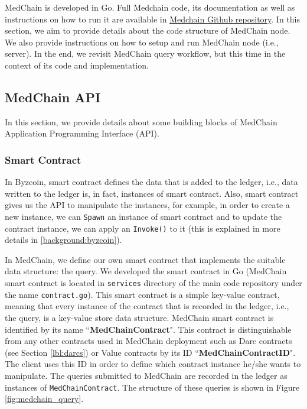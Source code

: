 MedChain is developed in Go. Full Medchain code, its documentation as well as instructions on how to run it are available in \href{https://github.com/ldsec/medchain/tree/dev}{Medchain Github repository}. In this section, we aim to provide details about the code structure of MedChain node. We also provide instructions on how to setup and run MedChain node (i.e., server). In the end, we revisit MedChain query workflow, but this time in the context of its code and implementation.  

\subsection{MedChain API}
In this section, we provide details about some building blocks of MedChain Application Programming Interface (API). 

\subsubsection{Smart Contract}
In Byzcoin, smart contract defines the data that is added to the ledger, i.e., data written to the ledger is, in fact, instances of smart contract. Also, smart contract gives us the API to manipulate the instances, for example, in order to create a new instance, we can \texttt{Spawn} an instance of smart contract and to update the contract instance, we can apply an \texttt{Invoke()} to it (this is explained in more details in \ref{background:byzcoin}). 

In MedChain, we define our own smart contract that implements the suitable data structure: the query. We developed the smart contract in Go (MedChain smart contract is located in \texttt{services} directory of the main code repository under the name \texttt{contract.go}). This smart contract is a simple key-value contract, meaning that every instance of the contract that is recorded in the ledger, i.e., the query, is a key-value store data structure. MedChain smart contract is identified by its name ``\textbf{MedChainContract}". This contract is distinguishable from any other contracts used in MedChain deployment such as Darc contracts (see Section \ref{lbl:darcs}) or Value contracts by its ID ``\textbf{MedChainContractID}". The client uses this ID in order to define which contract instance he/she wants to manipulate. The queries submitted to MedChain are recorded in the ledger as instances of \texttt{MedChainContract}. The structure of these queries is shown in Figure \ref{fig:medchain_query}. 

